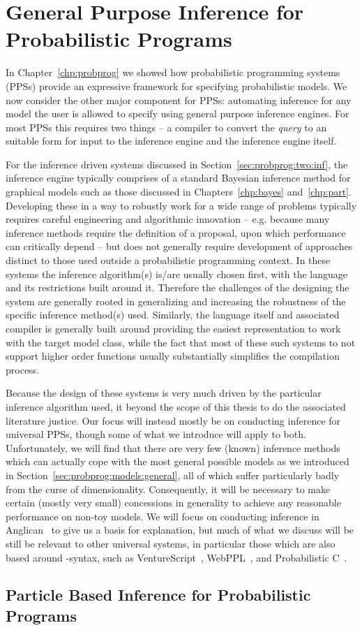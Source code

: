 
\chapter{General Purpose Inference for Probabilistic Programs}
\label{chp:proginf}

In Chapter~\ref{chp:probprog} we showed how probabilistic programming systems (PPSs) provide
an expressive framework for specifying probabilistic models.  We now consider the other major component
for PPSs: automating inference for any model the user is allowed to specify using general purpose
inference engines.  For most PPSs this requires two things --  a compiler to convert the \emph{query} to an
suitable form for input to the inference engine and the inference engine itself.  

For the inference
driven systems discussed in Section~\ref{sec:probprog:two:inf}, the inference engine typically comprises of
a standard Bayesian inference method for graphical models such as those discussed in Chapters~\ref{chp:bayes}
and~\ref{chp:part}.  Developing these in a way to robustly work for a wide range of problems typically
requires careful engineering and algorithmic innovation -- e.g. because many inference methods require the definition of
a proposal, upon which performance can critically depend -- but does not generally require development 
of approaches distinct to those used outside a probabilistic programming context.  In these 
systems the inference algorithm(s) is/are usually chosen first, with the language and its restrictions built around it.
Therefore the challenges of the designing the system are generally rooted in generalizing and increasing the robustness of the 
specific inference method(s) used.  Similarly, the language itself and associated compiler is generally built
around providing the easiest representation to work with the target model class, while the fact that most of
these such systems to not support higher order functions usually substantially simplifies the compilation
process.

Because the design of these systems is very much driven by the particular inference algorithm used, it
beyond the scope of this thesis to do the associated literature justice.  Our focus will instead mostly be on 
conducting inference for universal PPSs, though some of what we introduce will apply to both.
Unfortunately, we will find that there are very few (known) inference
methods which can actually cope with the most general possible models as we introduced in
Section~\ref{sec:probprog:models:general}, all of which suffer particularly badly from the curse of
dimensionality.  Consequently, it will be necessary to make certain (mostly very small) concessions in 
generality to achieve any reasonable performance on non-toy models.  We will focus on conducting
inference in Anglican~\citep{wood2014new,tolpin2016design} to give us a basis for explanation, but much of
what we discuss will be still be relevant to other universal systems, in particular those which
are also based around \sample-\observe syntax, such as VentureScript~\citep{mansinghka2014venture}, 
WebPPL~\citep{goodman_book_2014}, and Probabilistic C~\citep{paige2014compilation}.



\section{Particle Based Inference for Probabilistic Programs}
\label{sec:proginf:part}